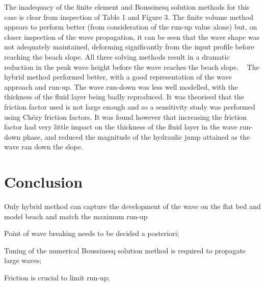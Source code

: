 The inadequacy of the finite element and Boussinesq solution methods for this
case is clear from inspection of Table 1 and Figure 3.  The finite volume
method appears to perform better (from consideration of the run-up value alone)
but, on closer inspection of the wave propagation, it can be seen that the wave
shape was not adequately maintained, deforming significantly from the input
profile before reaching the beach slope. All three solving methods result in a
dramatic reduction in the peak wave height before the wave reaches the beach
slope.
   
The hybrid method performed better, with a good representation of the wave
approach and run-up.  The wave run-down was less well modelled, with the
thickness of the fluid layer being badly reproduced. It was theorised that the
friction factor used is not large enough and so a sensitivity study was
performed using Chézy friction factors. It was found however that increasing
the friction factor had very little impact on the thickness of the fluid layer
in the wave run-down phase, and reduced the magnitude of the hydraulic jump
attained as the wave ran down the slope.

\section{Conclusion}

Only hybrid method can capture the development of the wave on the flat bed and
model beach and match the maximum run-up

Point of wave breaking needs to be decided a posteriori;

Tuning of the numerical Boussinesq solution method is required to propagate large waves;

Friction is crucial to limit run-up;
